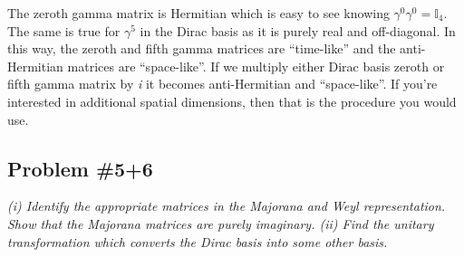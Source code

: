 \documentclass[]{article}
\numberwithin{equation}{subsection}
\begin{document}
The zeroth gamma matrix is Hermitian which is easy to see knowing $\gamma^{0}\gamma^{0}=\mathbb{I}_{4}$. The same is true for $\gamma^{5}$ in the Dirac basis as it is purely real and off-diagonal. In this way, the zeroth and fifth gamma matrices are ``time-like'' and the anti-Hermitian matrices are ``space-like''. If we multiply either Dirac basis zeroth or fifth gamma matrix by \emph{i} it becomes anti-Hermitian and ``space-like''. If you're interested in additional spatial dimensions, then that is the procedure you would use.

\subsection*{Problem \#5+6}
\emph{(i) Identify the appropriate matrices in the Majorana and Weyl representation. Show that the Majorana matrices are purely imaginary. (ii) Find the unitary transformation which converts the Dirac basis into some other basis.}\\
\end{document}
